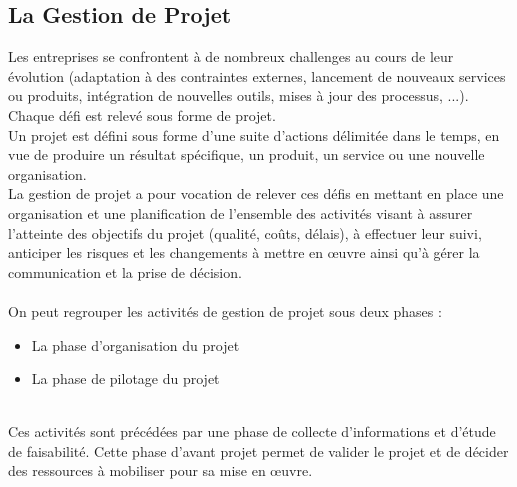\begin{spacing}{1.5}
\section{La Gestion de Projet}
Les entreprises se confrontent à de nombreux challenges au cours de leur évolution (adaptation à des contraintes externes, lancement de nouveaux services ou produits, intégration de nouvelles outils, mises à jour des processus, ...). Chaque défi est relevé sous forme de projet.\\
Un projet est défini sous forme d'une suite d'actions délimitée dans le temps, en vue de produire un résultat spécifique, un produit, un service ou une nouvelle organisation.\\
La gestion de projet a pour vocation de relever ces défis en mettant en place une organisation et une planification de l’ensemble des activités visant à assurer l’atteinte des objectifs du projet (qualité, coûts, délais), à effectuer leur suivi, anticiper les risques et les changements à mettre en œuvre  ainsi qu'à gérer la communication et la prise de décision.\\
\\
On peut regrouper les activités de gestion de projet sous deux phases :
\begin{itemize}
    \item La phase d'organisation du projet
    \item La phase de pilotage du projet
\end{itemize}
\\
Ces activités sont précédées par une phase de collecte d'informations et d'étude de faisabilité. Cette phase d'avant projet permet de valider le projet et de décider des ressources à mobiliser pour sa mise en œuvre.

\end{spacing}
